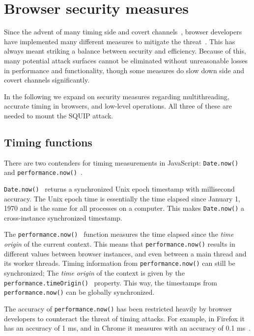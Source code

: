 \documentclass[11pt,
  titlepage=false,
  parskip=half,      %
]{scrreprt}
\begin{document}
\section{Browser security measures}
\label{sec:browsersecurity}
Since the advent of many timing side and covert channels~\cite{noack2018exploiting, Rokicki2022webport, gruss2016rowhammer, 185126},
browser developers have implemented many different measures to mitigate the threat~\cite{shusterman2021prime, performancenow, performancenowchrome, schwarz2018javascript}.
This has always meant striking a balance between security and efficiency.
Because of this, many potential attack surfaces cannot be eliminated without unreasonable losses in performance and functionality,
though some measures do slow down side and covert channels significantly.

In the following we expand on security measures regarding multithreading, accurate timing in browsers, and low-level operations.
All three of these are needed to mount the SQUIP attack.


\subsection{Timing functions}\label{subsec:timingjs}
There are two contenders for timing measurements in JavaScript: \texttt{Date.now()}~\cite{datenow} and \texttt{performance.now()}~\cite{performancenow}.

\texttt{Date.now()}~\cite{datenow} returns a synchronized Unix epoch timestamp with millisecond accuracy.
The Unix epoch time is essentially the time elapsed since January 1, 1970 and is the same for all processes on a computer.
This makes \texttt{Date.now()} a cross-instance synchronized timestamp.

The \texttt{performance.now()}~\cite{performancenow} function measures the time elapsed since the \textit{time origin} of the current context.
This means that \texttt{performance.now()} results in different values between browser instances, and even between a main thread and its worker threads.
Timing information from \texttt{performance.now()} can still be synchronized;
The \textit{time origin} of the context is given by the \texttt{performance.timeOrigin()}~\cite{performancetimeorigin} property.
This way, the timestamps from \texttt{performance.now()} can be globally synchronized.

The accuracy of \texttt{performance.now()} has been restricted heavily by browser developers to counteract the threat of timing attacks.
For example, in Firefox it has an accuracy of 1 ms, and in Chrome it measures with an accuracy of 0.1 ms~\cite{performancenow, performancenowchrome}.
\end{document}
